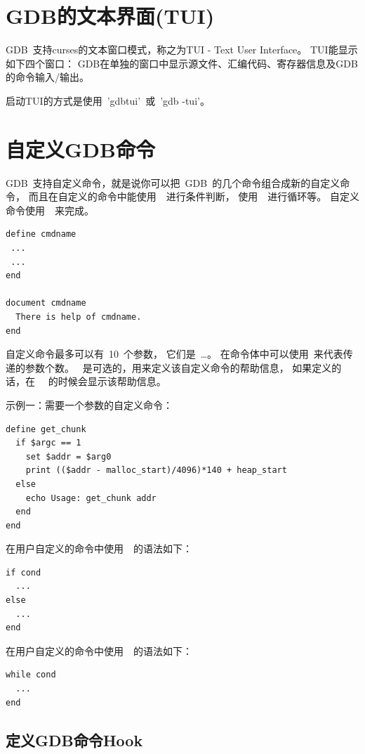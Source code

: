 \section{GDB的文本界面(TUI)}
\label{sec:tui}
GDB~支持curses的文本窗口模式，称之为TUI - Text User Interface。
TUI能显示如下四个窗口：
GDB在单独的窗口中显示源文件、汇编代码、寄存器信息及GDB的命令输入/输出。

启动TUI的方式是使用~'gdbtui'~或~'gdb -tui'。

\section{自定义GDB命令}

GDB~支持自定义命令，就是说你可以把~GDB~的几个命令组合成新的自定义命令，
而且在自定义的命令中能使用~~进行条件判断，
使用~~进行循环等。
自定义命令使用~~来完成。

\begin{lstlisting}
define cmdname
 ...
 ...
end

document cmdname
  There is help of cmdname.
end
\end{lstlisting}

自定义命令最多可以有~10~个参数，
它们是~\ldots{}。
在命令体中可以使用~来代表传递的参数个数。
~是可选的，用来定义该自定义命令的帮助信息，
如果定义的话，在~ ~的时候会显示该帮助信息。

示例一：需要一个参数的自定义命令：
\begin{lstlisting}
define get_chunk
  if $argc == 1
    set $addr = $arg0
    print (($addr - malloc_start)/4096)*140 + heap_start
  else
    echo Usage: get_chunk addr
  end
end
\end{lstlisting}

在用户自定义的命令中使用~~的语法如下：
\begin{lstlisting}
if cond
  ...
else
  ...
end
\end{lstlisting}

在用户自定义的命令中使用~~的语法如下：
\begin{lstlisting}
while cond
  ...
end
\end{lstlisting}

\subsection{定义GDB命令Hook}

